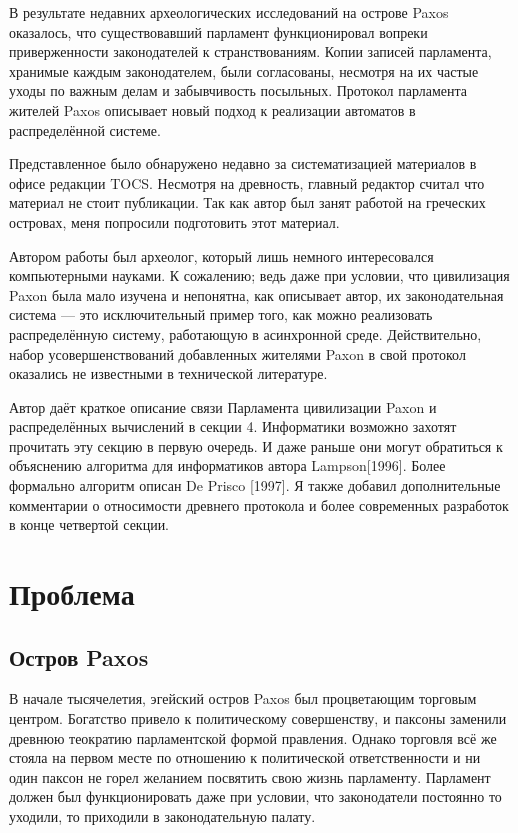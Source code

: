 \documentclass[12pt, a4paper]{article} %
\begin{document}
В результате недавних археологических исследований на острове Paxos оказалось, что существовавший парламент функционировал вопреки приверженности законодателей к странствованиям. Копии записей парламента, хранимые каждым законодателем, были согласованы, несмотря на их частые уходы по важным делам и забывчивость посыльных. Протокол парламента жителей Paxos описывает новый подход к реализации автоматов в распределённой системе.

Представленное было обнаружено недавно за систематизацией материалов в офисе редакции TOCS. Несмотря на древность, главный редактор считал что материал не стоит публикации. Так как автор был занят работой на греческих островах, меня попросили подготовить этот материал.

Автором работы был археолог, который лишь немного интересовался компьютерными науками. К сожалению; ведь даже при условии, что цивилизация Paxon была мало изучена и непонятна, как описывает автор, их законодательная система --- это исключительный пример того, как можно реализовать распределённую систему, работающую в асинхронной среде. Действительно, набор усовершенствований добавленных жителями Paxon в свой протокол оказались не известными в технической литературе.

Автор даёт краткое описание связи Парламента цивилизации Paxon и распределённых вычислений в секции 4. Информатики возможно захотят прочитать эту секцию в первую очередь. И даже раньше они могут обратиться к объяснению алгоритма для информатиков автора Lampson[1996]. Более формально алгоритм описан De Prisco [1997]. Я также добавил дополнительные комментарии о относимости древнего протокола и более современных разработок в конце четвертой секции.

\newpage
\section{Проблема}
\subsection{Остров Paxos}

В начале тысячелетия, эгейский остров Paxos был процветающим торговым центром. Богатство привело к политическому совершенству, и паксоны заменили древнюю теократию парламентской формой правления. Однако торговля всё же стояла на первом месте по отношению к политической ответственности и ни один паксон не горел желанием посвятить свою жизнь парламенту. Парламент должен был функционировать даже при условии, что законодатели постоянно то уходили, то приходили в законодательную палату.
\end{document}
